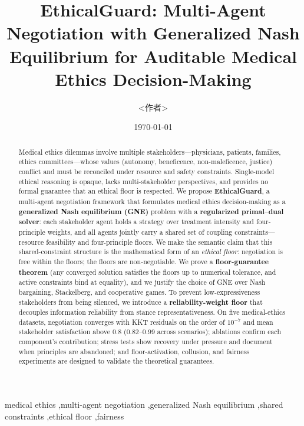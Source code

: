\documentclass[11pt]{article}
\title{EthicalGuard: Multi-Agent Negotiation with Generalized Nash Equilibrium
for Auditable Medical Ethics Decision-Making}
\author{<作者>}
\date{\today}
\begin{document}
\maketitle

\begin{abstract}
Medical ethics dilemmas involve multiple stakeholders---physicians, patients,
families, ethics committees---whose values (autonomy, beneficence,
non-maleficence, justice) conflict and must be reconciled under resource and
safety constraints. Single-model ethical reasoning is opaque, lacks
multi-stakeholder perspectives, and provides no formal guarantee that an
ethical floor is respected. We propose \textbf{EthicalGuard}, a multi-agent
negotiation framework that formulates medical ethics decision-making as a
\textbf{generalized Nash equilibrium (GNE)} problem with a
\textbf{regularized primal--dual solver}: each stakeholder agent holds a
strategy over treatment intensity and four-principle weights, and all agents
jointly carry a shared set of coupling constraints---resource feasibility and
four-principle floors. We make the semantic claim that this shared-constraint
structure is the mathematical form of an \emph{ethical floor}: negotiation is
free within the floors; the floors are non-negotiable. We prove a
\textbf{floor-guarantee theorem} (any converged solution satisfies the floors
up to numerical tolerance, and active constraints bind at equality), and we
justify the choice of GNE over Nash bargaining, Stackelberg, and cooperative
games. To prevent low-expressiveness stakeholders from being silenced, we
introduce a \textbf{reliability-weight floor} that decouples information
reliability from stance representativeness. On five medical-ethics datasets,
negotiation converges with KKT residuals on the order of $10^{-7}$ and mean
stakeholder satisfaction above 0.8 (0.82--0.99 across scenarios); ablations
confirm each component's contribution; stress tests show recovery under
pressure and document when principles are abandoned; and floor-activation,
collusion, and fairness experiments are designed to validate the theoretical
guarantees.
\end{abstract}

\begin{keywords}
medical ethics \sep multi-agent negotiation \sep generalized Nash equilibrium
\sep shared constraints \sep ethical floor \sep fairness
\end{keywords}

\end{document}
